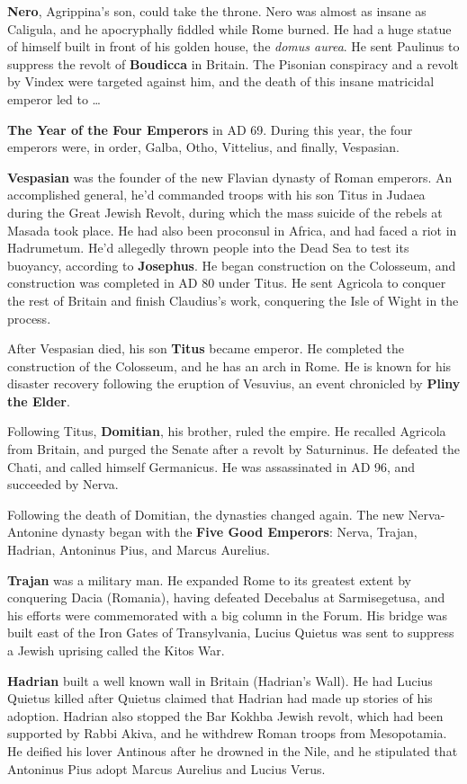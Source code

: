 \textbf{Nero}, Agrippina's son, could take the throne.
Nero was almost as insane as Caligula, and he apocryphally fiddled while Rome burned.
He had a huge statue of himself built in front of his golden house, the \textit{domus aurea}.
He sent Paulinus to suppress the revolt of \textbf{Boudicca} in Britain.
The Pisonian conspiracy and a revolt by Vindex were targeted against him,
and the death of this insane matricidal emperor led to \ldots

\textbf{The Year of the Four Emperors} in AD 69. During this year, the four emperors were, in order,
Galba, Otho, Vittelius, and finally, Vespasian.

\textbf{Vespasian} was the founder of the new Flavian dynasty of Roman emperors.
An accomplished general, he'd commanded troops with his son Titus in Judaea during the Great Jewish Revolt,
during which the mass suicide of the rebels at Masada took place.
He had also been proconsul in Africa, and had faced a riot in Hadrumetum.
He'd allegedly thrown people into the Dead Sea to test its buoyancy, according to \textbf{Josephus}.
He began construction on the Colosseum, and construction was completed in AD 80 under Titus.
He sent Agricola to conquer the rest of Britain and finish Claudius's work,
conquering the Isle of Wight in the process.

After Vespasian died, his son \textbf{Titus} became emperor.
He completed the construction of the Colosseum, and he has an arch in Rome.
He is known for his disaster recovery following the eruption of Vesuvius,
an event chronicled by \textbf{Pliny the Elder}.

Following Titus, \textbf{Domitian}, his brother, ruled the empire.
He recalled Agricola from Britain, and purged the Senate after a revolt by Saturninus.
He defeated the Chati, and called himself Germanicus.
He was assassinated in AD 96, and succeeded by Nerva.

Following the death of Domitian, the dynasties changed again.
The new Nerva-Antonine dynasty began with the \textbf{Five Good Emperors}:
Nerva, Trajan, Hadrian, Antoninus Pius, and Marcus Aurelius.

\textbf{Trajan} was a military man.
He expanded Rome to its greatest extent by conquering Dacia (Romania),
having defeated Decebalus at Sarmisegetusa,
and his efforts were commemorated with a big column in the Forum.
His bridge was built east of the Iron Gates of Transylvania,
Lucius Quietus was sent to suppress a Jewish uprising called the Kitos War.

\textbf{Hadrian} built a well known wall in Britain (Hadrian's Wall).
He had Lucius Quietus killed after Quietus claimed that Hadrian had made up stories of his adoption.
Hadrian also stopped the Bar Kokhba Jewish revolt, which had been supported by Rabbi Akiva,
and he withdrew Roman troops from Mesopotamia.
He deified his lover Antinous after he drowned in the Nile,
and he stipulated that Antoninus Pius adopt Marcus Aurelius and Lucius Verus.

